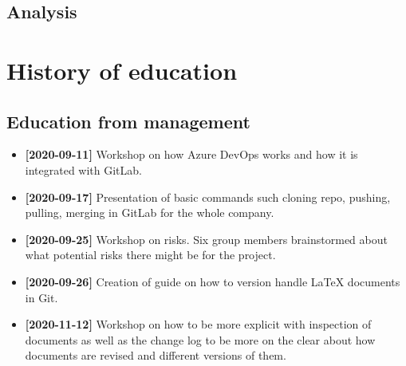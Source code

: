\documentclass[12pt]{article}
\begin{document}
\subsection{Analysis}


    \section{History of education}
\subsection{Education from management}
\begin{itemize}
 \item \textbf{[2020-09-11]} Workshop on how Azure DevOps works and how it is integrated with GitLab.
    \item \textbf{[2020-09-17]} Presentation of basic commands such cloning repo, pushing, pulling, merging in GitLab for the whole company. 
        \item \textbf{[2020-09-25]} Workshop on risks. Six group members brainstormed about what potential risks there might be for the project.

    \item \textbf{[2020-09-26]} Creation of guide on how to version handle LaTeX documents in Git.
    \item \textbf{[2020-11-12]} Workshop on how to be more explicit with inspection of documents as well as the change log to be more on the clear about how documents are revised and different versions of them. 
\end{itemize}
\end{document}
